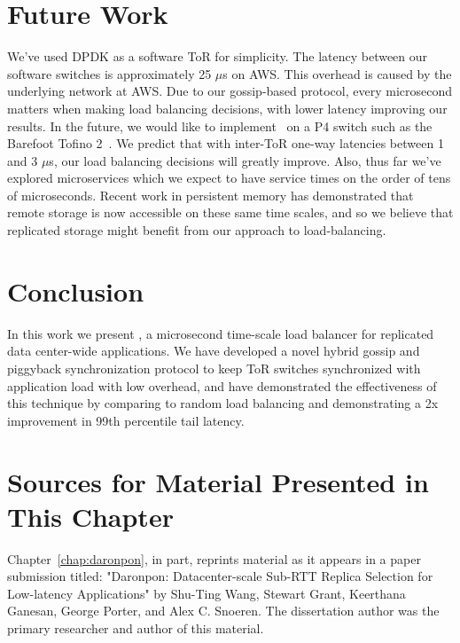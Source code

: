 \section{Future Work}
\label{sec:future}

We've used DPDK as a software ToR for simplicity. The latency between our
software switches is approximately 25 $\mu$s on AWS.  This overhead is caused
by the underlying network at AWS. Due to our gossip-based protocol, every
microsecond matters when making load balancing decisions, with lower latency
improving our results. In the future, we would like to implement \toolname\ on
a P4 switch such as the Barefoot Tofino 2~\cite{tofino2}. We predict that with
inter-ToR one-way latencies between 1 and 3 $\mu$s, our load balancing
decisions will greatly improve.  Also, thus far we've explored microservices
which we expect to have service times on the order of tens of microseconds.
Recent work in persistent memory has demonstrated that remote storage is now
accessible on these same time scales, and so we believe that replicated storage
might benefit from our approach to load-balancing.

\section{Conclusion}
\label{sec:conclusion}

In this work we present \toolname, a microsecond time-scale load balancer for
replicated data center-wide applications.  We have developed a novel hybrid
gossip and piggyback synchronization protocol to keep ToR switches synchronized
with application load with low overhead, and have demonstrated the
effectiveness of this technique by comparing to random load balancing and
demonstrating a 2x improvement in 99th percentile tail latency.

\section{Sources for Material Presented in This Chapter}
Chapter~\ref{chap:daronpon}, in part, reprints material as it appears in a paper submission titled: 
"Daronpon: Datacenter-scale Sub-RTT Replica Selection for Low-latency Applications"
by Shu-Ting Wang, Stewart Grant, Keerthana Ganesan, George Porter, and Alex C. Snoeren.
The dissertation author was the primary researcher and author of this material.

